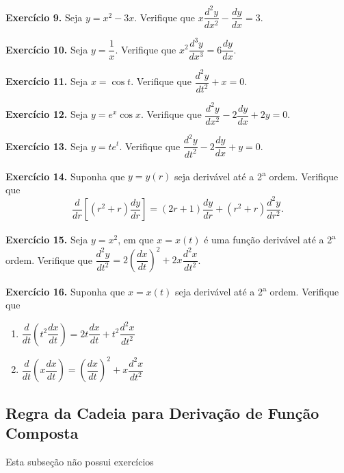 \documentclass[12pt,a4paper]{article}
\begin{document}
\vspace{0.5cm}
\noindent\textbf{Exercício 9.}
Seja $y = x^2 - 3x$. Verifique que $x \dfrac{d^2 y}{dx^2} - \dfrac{dy}{dx} = 3$.

\vspace{0.5cm}
\noindent\textbf{Exercício 10.}
Seja $y = \dfrac{1}{x}$. Verifique que $x^2 \dfrac{d^3 y}{dx^3} = 6 \dfrac{dy}{dx}$.

\vspace{0.5cm}
\noindent\textbf{Exercício 11.}
Seja $x = \cos t$. Verifique que $\dfrac{d^2 y}{dt^2} + x = 0$.

\vspace{0.5cm}
\noindent\textbf{Exercício 12.}
Seja $y = e^x \cos x$. Verifique que $\dfrac{d^2 y}{dx^2} - 2\dfrac{dy}{dx} + 2y = 0$.

\vspace{0.5cm}
\noindent\textbf{Exercício 13.}
Seja $y = te^t$. Verifique que $\dfrac{d^2 y}{dt^2} - 2\dfrac{dy}{dx} + y = 0$.

\vspace{0.5cm}
\noindent\textbf{Exercício 14.}
Suponha que $y = y(r)$ seja derivável até a 2\textsuperscript{a} ordem. Verifique que
\[
\dfrac{d}{dr}\!\left[(r^2 + r)\dfrac{dy}{dr}\right] = (2r + 1)\dfrac{dy}{dr} + (r^2 + r)\dfrac{d^2 y}{dr^2}.
\]

\vspace{0.5cm}
\noindent\textbf{Exercício 15.}
Seja $y = x^2$, em que $x = x(t)$ é uma função derivável até a 2\textsuperscript{a} ordem. Verifique que $\dfrac{d^2 y}{dt^2} = 2\!\left(\dfrac{dx}{dt}\right)^{\!2} + 2x\dfrac{d^2 x}{dt^2}$.

\vspace{0.5cm}
\noindent\textbf{Exercício 16.} Suponha que $x = x(t)$ seja derivável até a 2\textsuperscript{a} ordem. Verifique que
\begin{enumerate}
    \renewcommand{\theenumi}{\alph{enumi}}
    \renewcommand{\labelenumi}{\theenumi)}
    \item $\dfrac{d}{dt}\!\left(t^2 \dfrac{dx}{dt}\right) = 2t\dfrac{dx}{dt} + t^2 \dfrac{d^2 x}{dt^2}$
    \item $\dfrac{d}{dt}\!\left(x \dfrac{dx}{dt}\right) = \left(\dfrac{dx}{dt}\right)^{\!2} + x\dfrac{d^2 x}{dt^2}$
\end{enumerate}

\subsection{Regra da Cadeia para Derivação de Função Composta}
Esta subseção não possui exercícios
\end{document}
